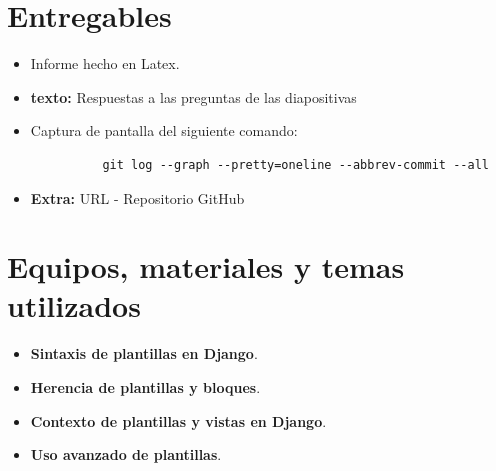 \documentclass{article}
\begin{document}
 
  \section{Entregables}
    \begin{itemize}
      \item Informe hecho en Latex.
      \item \textbf{texto: }Respuestas a las preguntas de las diapositivas 
      \item Captura de pantalla del siguiente comando:
        \begin{verbatim}
          git log --graph --pretty=oneline --abbrev-commit --all
        \end{verbatim}
      \item \textbf{Extra: }URL - Repositorio GitHub
    \end{itemize}
  
		
	\section{Equipos, materiales y temas utilizados}
    \begin{itemize}
      \item \textbf{Sintaxis de plantillas en Django}.
      \item \textbf{Herencia de plantillas y bloques}.
      \item \textbf{Contexto de plantillas y vistas en Django}.
      \item \textbf{Uso avanzado de plantillas}.
    \end{itemize}

\end{document}
